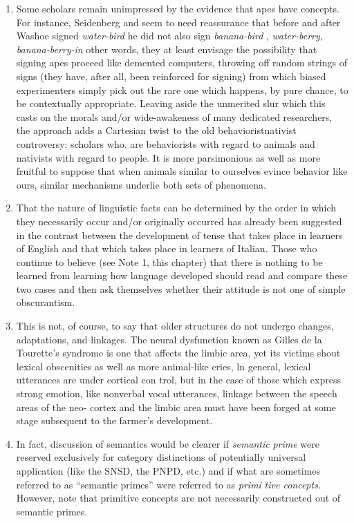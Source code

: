 \begin{enumerate}
\item Some scholars remain unimpressed by the evidence that apes have concepts. For instance, Seidenberg and \citet{Petitto1979} seem to
need reassurance that before and after Washoe signed \textit{water-bird} he did not also sign \textit{banana-bird} , \textit{water-berry,} \textit{banana-berry-in} other words, they at least envisage the possibility that signing apes proceed like
demented computers, throwing off random strings of signs (they have, after all, been reinforced for signing) from which biased experimenters simply pick out the rare one which happens, by pure chance, to be contextually appropriate. Leaving aside the unmerited slur which this casts on the morals and/or wide-awakeness of many dedicated re\-searchers, the approach adds a Cartesian twist to the old behaviorist\-nativist controversy: scholars who. are behaviorists with regard to animals and nativists with regard to people. It is more parsimonious as well as more fruitful to suppose that when animals similar to our\-selves evince behavior like ours, similar mechanisms underlie both sets of phenomena. 
\item That the nature of linguistic facts can be determined by the order in which they necessarily occur and/or originally occurred has already been suggested in the contrast between the development of tense that takes place in learners of English and that which takes place in learners of Italian. Those who continue to believe (see Note 1, this chapter) that there is nothing to be learned from learning how language developed should read and compare these two cases and then ask themselves whether their attitude is not one of simple obscurantism.
\item This is not, of course, to say that older structures do not undergo changes, adaptations, and linkages. The neural dysfunction known as Gilles de la Tourette's syndrome is one that affects the limbic area, yet its victims shout lexical obscenities as well as more animal-like cries, ln general, lexical utterances are under cortical con trol, but in the case of those which express strong emotion, like non\-verbal vocal utterances, linkage between the speech areas of the neo- cortex and the limbic area must have been forged at some stage sub\-sequent to the farmer's development.
\item In fact, discussion of semantics would be clearer if \textit{semantic} \textit{prime} were reserved exclusively for category distinctions of potentially universal application (like the SNSD, the PNPD, etc.) and if what are sometimes referred to as ``semantic primes'' were referred to as \textit{primi\-} \textit{tive concepts.} However, note that primitive concepts are not necessarily constructed out of semantic primes. 

\end{enumerate}
